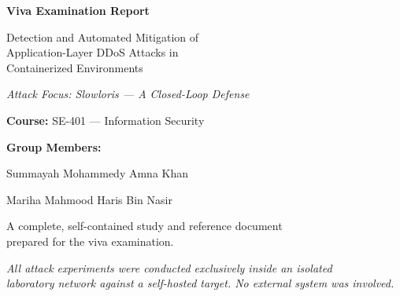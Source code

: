 \documentclass[11pt,a4paper]{article}
\begin{document}
\begin{titlepage}
\centering
\vspace*{2cm}
{\color{navy}\Huge\bfseries Viva Examination Report\par}
\vspace{1cm}
{\LARGE Detection and Automated Mitigation of\\ Application-Layer DDoS Attacks in\\ Containerized Environments\par}
\vspace{0.6cm}
{\large\itshape Attack Focus: Slowloris --- A Closed-Loop Defense\par}
\vspace{2cm}
{\large\textbf{Course:} SE-401 --- Information Security\par}
\vspace{0.4cm}
{\large\textbf{Group Members:}\par}
{\large Summayah Mohammedy \quad Amna Khan\par}
{\large Mariha Mahmood \quad Haris Bin Nasir\par}
\vspace{2cm}
{\large A complete, self-contained study and reference document\\ prepared for the viva examination.\par}
\vfill
{\itshape All attack experiments were conducted exclusively inside an isolated\\ laboratory network against a self-hosted target. No external system was involved.\par}
\end{titlepage}

\tableofcontents
\newpage

\end{document}
